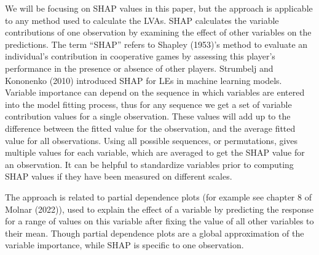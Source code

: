 \documentclass[
]{article}
\begin{document}
We will be focusing on SHAP values in this paper, but the approach is applicable to any method used to calculate the LVAs. SHAP calculates the variable contributions of one observation by examining the effect of other variables on the predictions. The term ``SHAP'' refers to Shapley (1953)'s method to evaluate an individual's contribution in cooperative games by assessing this player's performance in the presence or absence of other players. Strumbelj and Kononenko (2010) introduced SHAP for LEs in machine learning models. Variable importance can depend on the sequence in which variables are entered into the model fitting process, thus for any sequence we get a set of variable contribution values for a single observation. These values will add up to the difference between the fitted value for the observation, and the average fitted value for all observations. Using all possible sequences, or permutations, gives multiple values for each variable, which are averaged to get the SHAP value for an observation. It can be helpful to standardize variables prior to computing SHAP values if they have been measured on different scales.

The approach is related to partial dependence plots (for example see chapter 8 of Molnar (2022)), used to explain the effect of a variable by predicting the response for a range of values on this variable after fixing the value of all other variables to their mean. Though partial dependence plots are a global approximation of the variable importance, while SHAP is specific to one observation.
\end{document}
